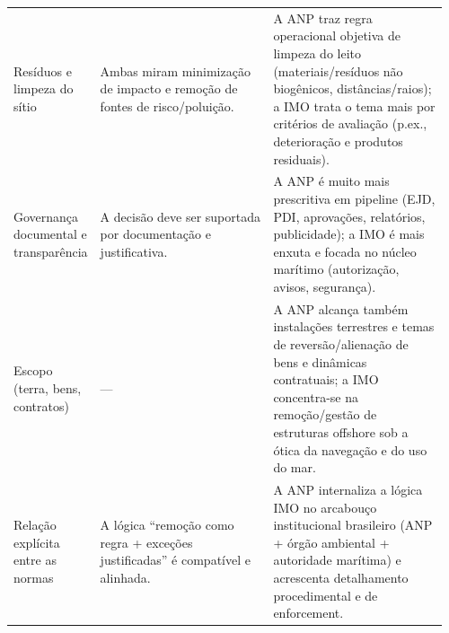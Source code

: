 \begin{landscape}
\begin{longtable}{@{}
  >{\RaggedRight\arraybackslash}p{0.14\linewidth}
  >{\RaggedRight\arraybackslash}p{0.41\linewidth}
  >{\RaggedRight\arraybackslash}p{0.41\linewidth}
@{}}
Resíduos e limpeza do sítio &
Ambas miram minimização de impacto e remoção de fontes de risco/poluição. &
A ANP traz regra operacional objetiva de limpeza do leito (materiais/resíduos não biogênicos, distâncias/raios); a IMO trata o tema mais por critérios de avaliação (p.ex., deterioração e produtos residuais). \\

Governança documental e transparência &
A decisão deve ser suportada por documentação e justificativa. &
A ANP é muito mais prescritiva em pipeline (EJD, PDI, aprovações, relatórios, publicidade); a IMO é mais enxuta e focada no núcleo marítimo (autorização, avisos, segurança). \\

Escopo (terra, bens, contratos) &
— &
A ANP alcança também instalações terrestres e temas de reversão/alienação de bens e dinâmicas contratuais; a IMO concentra-se na remoção/gestão de estruturas offshore sob a ótica da navegação e do uso do mar. \\

Relação explícita entre as normas &
A lógica “remoção como regra + exceções justificadas” é compatível e alinhada. &
A ANP internaliza a lógica IMO no arcabouço institucional brasileiro (ANP + órgão ambiental + autoridade marítima) e acrescenta detalhamento procedimental e de enforcement. \\

\end{longtable}
\normalsize

\end{landscape}